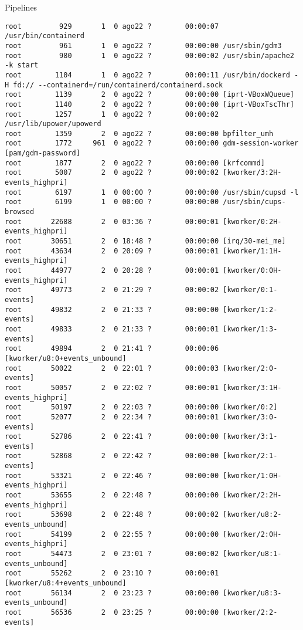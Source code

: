 \begin{section}{Pipelines}
\begin{lstlisting}[style=Ubuntu]
root         929       1  0 ago22 ?        00:00:07 /usr/bin/containerd
root         961       1  0 ago22 ?        00:00:00 /usr/sbin/gdm3
root         980       1  0 ago22 ?        00:00:02 /usr/sbin/apache2 -k start
root        1104       1  0 ago22 ?        00:00:11 /usr/bin/dockerd -H fd:// --containerd=/run/containerd/containerd.sock
root        1139       2  0 ago22 ?        00:00:00 [iprt-VBoxWQueue]
root        1140       2  0 ago22 ?        00:00:00 [iprt-VBoxTscThr]
root        1257       1  0 ago22 ?        00:00:02 /usr/lib/upower/upowerd
root        1359       2  0 ago22 ?        00:00:00 bpfilter_umh
root        1772     961  0 ago22 ?        00:00:00 gdm-session-worker [pam/gdm-password]
root        1877       2  0 ago22 ?        00:00:00 [krfcommd]
root        5007       2  0 ago22 ?        00:00:02 [kworker/3:2H-events_highpri]
root        6197       1  0 00:00 ?        00:00:00 /usr/sbin/cupsd -l
root        6199       1  0 00:00 ?        00:00:00 /usr/sbin/cups-browsed
root       22688       2  0 03:36 ?        00:00:01 [kworker/0:2H-events_highpri]
root       30651       2  0 18:48 ?        00:00:00 [irq/30-mei_me]
root       43634       2  0 20:09 ?        00:00:01 [kworker/1:1H-events_highpri]
root       44977       2  0 20:28 ?        00:00:01 [kworker/0:0H-events_highpri]
root       49773       2  0 21:29 ?        00:00:02 [kworker/0:1-events]
root       49832       2  0 21:33 ?        00:00:00 [kworker/1:2-events]
root       49833       2  0 21:33 ?        00:00:01 [kworker/1:3-events]
root       49894       2  0 21:41 ?        00:00:06 [kworker/u8:0+events_unbound]
root       50022       2  0 22:01 ?        00:00:03 [kworker/2:0-events]
root       50057       2  0 22:02 ?        00:00:01 [kworker/3:1H-events_highpri]
root       50197       2  0 22:03 ?        00:00:00 [kworker/0:2]
root       52077       2  0 22:34 ?        00:00:01 [kworker/3:0-events]
root       52786       2  0 22:41 ?        00:00:00 [kworker/3:1-events]
root       52868       2  0 22:42 ?        00:00:00 [kworker/2:1-events]
root       53321       2  0 22:46 ?        00:00:00 [kworker/1:0H-events_highpri]
root       53655       2  0 22:48 ?        00:00:00 [kworker/2:2H-events_highpri]
root       53698       2  0 22:48 ?        00:00:02 [kworker/u8:2-events_unbound]
root       54199       2  0 22:55 ?        00:00:00 [kworker/2:0H-events_highpri]
root       54473       2  0 23:01 ?        00:00:02 [kworker/u8:1-events_unbound]
root       55262       2  0 23:10 ?        00:00:01 [kworker/u8:4+events_unbound]
root       56134       2  0 23:23 ?        00:00:00 [kworker/u8:3-events_unbound]
root       56536       2  0 23:25 ?        00:00:00 [kworker/2:2-events]

\end{lstlisting}

\end{section}